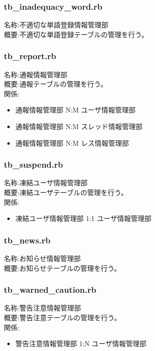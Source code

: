 \documentclass[a4j]{jarticle}
\begin{document}
\subsubsection{tb\_inadequacy\_word.rb}
  \noindent
  名称:不適切な単語登録情報管理部\\
  概要:不適切な単語登録テーブルの管理を行う。\\


\subsubsection{tb\_report.rb}
  \noindent
  名称:通報情報管理部\\
  概要:通報テーブルの管理を行う。\\
  関係:
  \begin{itemize}
  \item 通報情報管理部 N:M ユーザ情報管理部
  \item 通報情報管理部 N:M スレッド情報管理部
  \item 通報情報管理部 N:M レス情報管理部
  \end{itemize}



\subsubsection{tb\_suspend.rb}
  \noindent
  名称:凍結ユーザ情報管理部\\
  概要:凍結ユーザテーブルの管理を行う。\\
  関係:
  \begin{itemize}
  \item 凍結ユーザ情報管理部 1:1 ユーザ情報管理部
  \end{itemize}

\subsubsection{tb\_news.rb}
  \noindent
  名称:お知らせ情報管理部\\
  概要:お知らせテーブルの管理を行う。\\

\subsubsection{tb\_warned\_caution.rb}
  \noindent
  名称:警告注意情報管理部\\
  概要:警告注意テーブルの管理を行う。\\
  関係:
  \begin{itemize}
  \item 警告注意情報管理部 1:N ユーザ情報管理部
  \end{itemize}



\appendix
\end{document}
